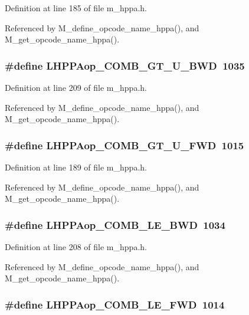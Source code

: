 Definition at line 185 of file m\_\-hppa.h.

Referenced by M\_\-define\_\-opcode\_\-name\_\-hppa(), and M\_\-get\_\-opcode\_\-name\_\-hppa().
\subsubsection{\setlength{\rightskip}{0pt plus 5cm}\#define LHPPAop\_\-COMB\_\-GT\_\-U\_\-BWD~1035}\label{m__hppa_8h_40d9c6d75f4965a6d64c48cf8d2c7691}




Definition at line 209 of file m\_\-hppa.h.

Referenced by M\_\-define\_\-opcode\_\-name\_\-hppa(), and M\_\-get\_\-opcode\_\-name\_\-hppa().
\subsubsection{\setlength{\rightskip}{0pt plus 5cm}\#define LHPPAop\_\-COMB\_\-GT\_\-U\_\-FWD~1015}\label{m__hppa_8h_5858921acc925d387b722945bd5da4e3}




Definition at line 189 of file m\_\-hppa.h.

Referenced by M\_\-define\_\-opcode\_\-name\_\-hppa(), and M\_\-get\_\-opcode\_\-name\_\-hppa().
\subsubsection{\setlength{\rightskip}{0pt plus 5cm}\#define LHPPAop\_\-COMB\_\-LE\_\-BWD~1034}\label{m__hppa_8h_9b7a56b6ebcb09c1fd831bfdbd13d3e5}




Definition at line 208 of file m\_\-hppa.h.

Referenced by M\_\-define\_\-opcode\_\-name\_\-hppa(), and M\_\-get\_\-opcode\_\-name\_\-hppa().
\subsubsection{\setlength{\rightskip}{0pt plus 5cm}\#define LHPPAop\_\-COMB\_\-LE\_\-FWD~1014}\label{m__hppa_8h_f012c986694b387b8a0cce50bb709767}




